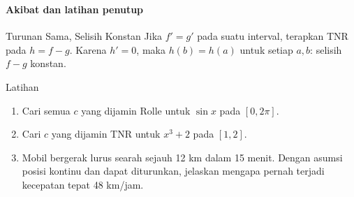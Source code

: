 \documentclass{../../kalkulus-ppt}
\begin{document}
\begin{frame}
\frametitle{\insertsection}
\framesubtitle{Akibat dan latihan penutup}

\begin{block}{Turunan Sama, Selisih Konstan}
Jika $f'=g'$ pada suatu interval, terapkan TNR pada $h=f-g$. Karena $h'=0$, maka $h(b)=h(a)$ untuk setiap $a,b$: selisih $f-g$ konstan.
\end{block}
\begin{exampleblock}{Latihan}\begin{enumerate}
\item Cari semua $c$ yang dijamin Rolle untuk $\sin x$ pada $[0,2\pi]$.
\item Cari $c$ yang dijamin TNR untuk $x^3+2$ pada $[1,2]$.
\item Mobil bergerak lurus searah sejauh 12 km dalam 15 menit. Dengan asumsi posisi kontinu dan dapat diturunkan, jelaskan mengapa pernah terjadi kecepatan tepat 48 km/jam.
\end{enumerate}\end{exampleblock}
\end{frame}
\end{document}
